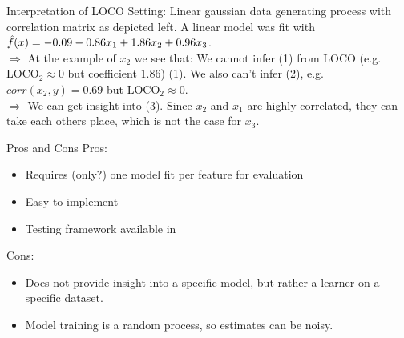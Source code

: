 \documentclass[11pt,compress,t,notes=noshow, xcolor=table]{beamer}
\begin{document}
\begin{vbframe}{Interpretation of LOCO}
Setting: Linear gaussian data generating process with correlation matrix as depicted left. A linear model was fit with $\fh(x) = -0.09 - 0.86 x_1 + 1.86 x_2 + 0.96 x_3$.\\
\lz
$\Rightarrow$ At the example of $x_2$ we see that: We cannot infer (1) from LOCO (e.g. $\text{LOCO}_2 \approx 0$ but coefficient $1.86$) (1). We also can't infer (2), e.g. $corr(x_2, y) = 0.69$ but $\text{LOCO}_2 \approx 0$.\\
$\Rightarrow$ We can get insight into (3). Since $x_2$ and $x_1$ are highly correlated, they can take each others place, which is not the case for $x_3$.
\framebreak


\end{vbframe}

\begin{vbframe}{Pros and Cons}
  Pros:
  \begin{itemize}
    \item Requires (only?) one model fit per feature for evaluation
    \item Easy to implement
    \item Testing framework available in \cite{lei_distribution-free_2018}
  \end{itemize}
%
  Cons:
  \begin{itemize}
    \item Does not provide insight into a specific model, but rather a learner on a specific dataset.
    \item Model training is a random process, so estimates can be noisy.
  \end{itemize}
\end{vbframe}

\begin{vbframe}
  \printbibliography
\end{vbframe}

\endlecture
\end{document}
